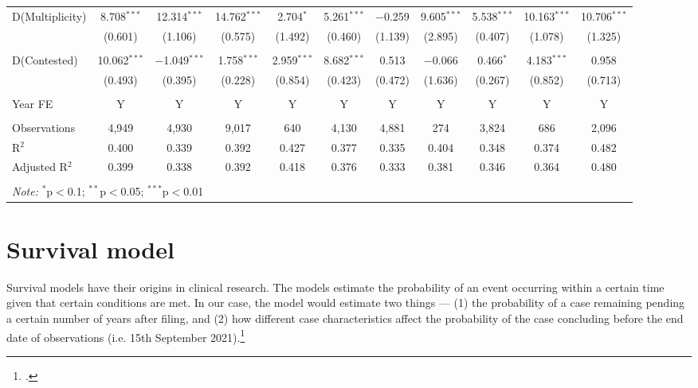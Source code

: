 \documentclass[12pt,a4paper]{article}
\begin{document}
\begin{appendices}
\begin{landscape}
\begin{table}
{\begin{tabular}{lcccccccccc}
						D(Multiplicity) & 8.708$^{***}$ & 12.314$^{***}$ & 14.762$^{***}$ & 2.704$^{*}$ & 5.261$^{***}$ & $-$0.259 & 9.605$^{***}$ & 5.538$^{***}$ & 10.163$^{***}$ & 10.706$^{***}$ \\ 
						& (0.601) & (1.106) & (0.575) & (1.492) & (0.460) & (1.139) & (2.895) & (0.407) & (1.078) & (1.325) \\ 
						& & & & & & & & & & \\ 
						D(Contested) & 10.062$^{***}$ & $-$1.049$^{***}$ & 1.758$^{***}$ & 2.959$^{***}$ & 8.682$^{***}$ & 0.513 & $-$0.066 & 0.466$^{*}$ & 4.183$^{***}$ & 0.958 \\ 
						& (0.493) & (0.395) & (0.228) & (0.854) & (0.423) & (0.472) & (1.636) & (0.267) & (0.852) & (0.713) \\ 
						\hline \\[-1.8ex]
						Year FE & Y & Y & Y & Y & Y & Y & Y & Y & Y & Y \\
						\hline \\[-1.8ex] 
						Observations & 4,949 & 4,930 & 9,017 & 640 & 4,130 & 4,881 & 274 & 3,824 & 686 & 2,096 \\ 
						R$^{2}$ & 0.400 & 0.339 & 0.392 & 0.427 & 0.377 & 0.335 & 0.404 & 0.348 & 0.374 & 0.482 \\ 
						Adjusted R$^{2}$ & 0.399 & 0.338 & 0.392 & 0.418 & 0.376 & 0.333 & 0.381 & 0.346 & 0.364 & 0.480 \\ 
						\hline \\[-1.8ex] 
						\multicolumn{11}{l}{\textit{Note:} $^{*}$p$<$0.1; $^{**}$p$<$0.05; $^{***}$p$<$0.01} \\ 
				\end{tabular} }
			\end{table}
		\end{landscape}
		
		\newpage
		\section{Survival model}
		\label{sec:survivalModel}
		
		Survival models have their origins in clinical research. The models estimate the probability of an event occurring within a certain time given that certain conditions are met. In our case, the model would estimate two things --- (1) the probability of a case remaining pending a certain number of years after filing, and (2) how different case characteristics affect the probability of the case concluding before the end date of observations (i.e. 15th September 2021).\footcite[For a prior example of the use of hazard models for empirical judicial analysis, see][]{datta2017_itatDelays}
		

\end{appendices}
\end{document}
